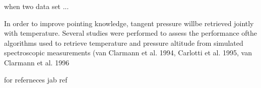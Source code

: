 when two data set ...


In order to improve pointing
knowledge, tangent pressure willbe
retrieved jointly with temperature.
Several studies were performed to
assess the performance ofthe
algorithms used to retrieve
temperature and pressure altitude
from simulated spectroscopic
measurements (van Clarmann et al.
1994, Carlotti et al. 1995,
van Clarmann et al. 1996


for referneces jab ref















